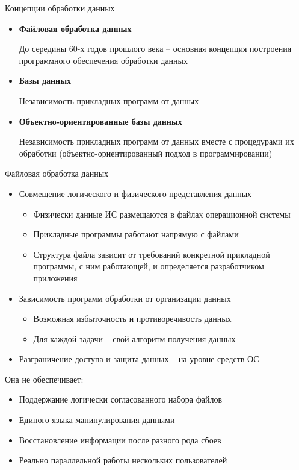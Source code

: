 \documentclass[12pt]{article}
\begin{document}
\begin{nota}{Концепции обработки данных}
    \begin{itemize}
        \item \textbf{Файловая обработка данных}
        
        До середины 60-х годов прошлого века – основная концепция построения программного обеспечения обработки данных

        \item \textbf{Базы данных}
        
        Независимость прикладных программ от данных

        \item \textbf{Объектно-ориентированные базы данных}
        
        Независимость прикладных программ от данных вместе с процедурами их обработки (объектно-ориентированный подход в программировании)
    \end{itemize}
\end{nota}

\begin{Remark}{Файловая обработка данных}
    \begin{itemize}
        \item Совмещение логического и физического представления данных
        \begin{itemize}
            \item Физически данные ИС размещаются в файлах операционной системы
            \item Прикладные программы работают напрямую с файлами
            \item Структура файла зависит от требований конкретной прикладной программы, с ним работающей, и определяется разработчиком приложения
        \end{itemize}
        \item Зависимость программ обработки от организации данных
        \begin{itemize}
            \item Возможная избыточность и противоречивость данных 
            \item Для каждой задачи – свой алгоритм получения данных 
        \end{itemize}
        \item Разграничение доступа и защита данных – на уровне средств ОС
    \end{itemize}

    Она не обеспечивает:
    \begin{itemize}
        \item Поддержание логически согласованного набора файлов
        \item Единого языка манипулирования данными
        \item Восстановление информации после разного рода сбоев
        \item Реально параллельной работы нескольких пользователей
    \end{itemize}
\end{Remark}
\end{document}

